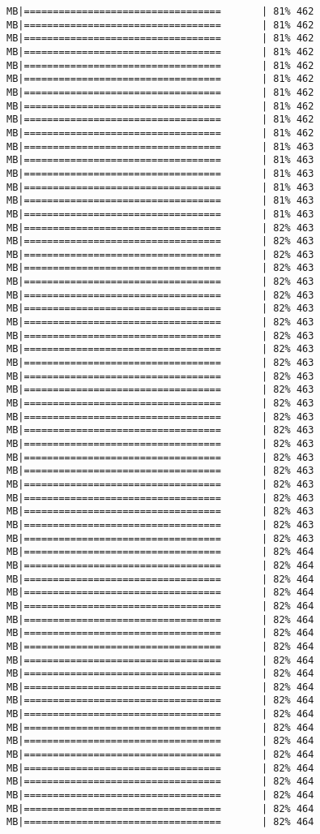 \documentclass[
]{article}
\begin{document}
\begin{verbatim}
MB|==================================       | 81% 462 MB|==================================       | 81% 462 MB|==================================       | 81% 462 MB|==================================       | 81% 462 MB|==================================       | 81% 462 MB|==================================       | 81% 462 MB|==================================       | 81% 462 MB|==================================       | 81% 462 MB|==================================       | 81% 462 MB|==================================       | 81% 462 MB|==================================       | 81% 463 MB|==================================       | 81% 463 MB|==================================       | 81% 463 MB|==================================       | 81% 463 MB|==================================       | 81% 463 MB|==================================       | 81% 463 MB|==================================       | 82% 463 MB|==================================       | 82% 463 MB|==================================       | 82% 463 MB|==================================       | 82% 463 MB|==================================       | 82% 463 MB|==================================       | 82% 463 MB|==================================       | 82% 463 MB|==================================       | 82% 463 MB|==================================       | 82% 463 MB|==================================       | 82% 463 MB|==================================       | 82% 463 MB|==================================       | 82% 463 MB|==================================       | 82% 463 MB|==================================       | 82% 463 MB|==================================       | 82% 463 MB|==================================       | 82% 463 MB|==================================       | 82% 463 MB|==================================       | 82% 463 MB|==================================       | 82% 463 MB|==================================       | 82% 463 MB|==================================       | 82% 463 MB|==================================       | 82% 463 MB|==================================       | 82% 463 MB|==================================       | 82% 463 MB|==================================       | 82% 464 MB|==================================       | 82% 464 MB|==================================       | 82% 464 MB|==================================       | 82% 464 MB|==================================       | 82% 464 MB|==================================       | 82% 464 MB|==================================       | 82% 464 MB|==================================       | 82% 464 MB|==================================       | 82% 464 MB|==================================       | 82% 464 MB|==================================       | 82% 464 MB|==================================       | 82% 464 MB|==================================       | 82% 464 MB|==================================       | 82% 464 MB|==================================       | 82% 464 MB|==================================       | 82% 464 MB|==================================       | 82% 464 MB|==================================       | 82% 464 MB|==================================       | 82% 464 MB|==================================       | 82% 464 MB|==================================       | 82% 464 
\end{verbatim}
\end{document}
